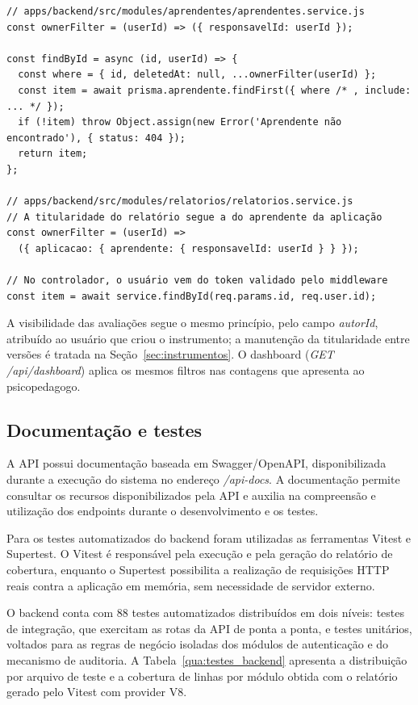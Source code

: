 \begin{lstlisting}[caption={Filtro de titularidade aplicado nas consultas de aprendentes e relatórios},label={cod:titularidade}]
// apps/backend/src/modules/aprendentes/aprendentes.service.js
const ownerFilter = (userId) => ({ responsavelId: userId });

const findById = async (id, userId) => {
  const where = { id, deletedAt: null, ...ownerFilter(userId) };
  const item = await prisma.aprendente.findFirst({ where /* , include: ... */ });
  if (!item) throw Object.assign(new Error('Aprendente não encontrado'), { status: 404 });
  return item;
};

// apps/backend/src/modules/relatorios/relatorios.service.js
// A titularidade do relatório segue a do aprendente da aplicação
const ownerFilter = (userId) =>
  ({ aplicacao: { aprendente: { responsavelId: userId } } });

// No controlador, o usuário vem do token validado pelo middleware
const item = await service.findById(req.params.id, req.user.id);
\end{lstlisting}

A visibilidade das avaliações segue o mesmo princípio, pelo campo \textit{autorId}, atribuído ao usuário que criou o instrumento; a manutenção da titularidade entre versões é tratada na Seção~\ref{sec:instrumentos}. O dashboard (\textit{GET /api/dashboard}) aplica os mesmos filtros nas contagens que apresenta ao psicopedagogo.

\subsection{Documentação e testes}

A API possui documentação baseada em Swagger/OpenAPI, disponibilizada durante a execução do sistema no endereço \textit{/api-docs}. A documentação permite consultar os recursos disponibilizados pela API e auxilia na compreensão e utilização dos endpoints durante o desenvolvimento e os testes.

Para os testes automatizados do backend foram utilizadas as ferramentas Vitest e Supertest. O Vitest é responsável pela execução e pela geração do relatório de cobertura, enquanto o Supertest possibilita a realização de requisições HTTP reais contra a aplicação em memória, sem necessidade de servidor externo.

O backend conta com 88 testes automatizados distribuídos em dois níveis: testes de integração, que exercitam as rotas da API de ponta a ponta, e testes unitários, voltados para as regras de negócio isoladas dos módulos de autenticação e do mecanismo de auditoria. A Tabela~\ref{qua:testes_backend} apresenta a distribuição por arquivo de teste e a cobertura de linhas por módulo obtida com o relatório gerado pelo Vitest com provider V8.

